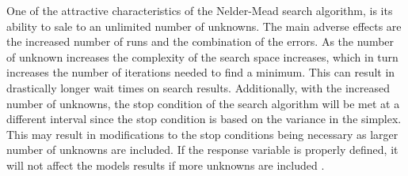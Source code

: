 \label{sensetivity_results}

One of the attractive characteristics of the Nelder-Mead search algorithm, is its ability to sale to an unlimited number of unknowns.  The main adverse effects are the increased number of runs and the combination of the errors.  As the number of unknown increases the complexity of the search space increases, which in turn increases the number of iterations needed to find a minimum.  This can result in drastically longer wait times on search results.  Additionally, with the increased number of unknowns, the stop condition of the search algorithm will be met at a different interval since the stop condition is based on the variance in the simplex.  This may result in modifications to the stop conditions being necessary as larger number of unknowns are included.  If the response variable is properly defined, it will not affect the models results if more unknowns are included \cite{wang_2011}.

